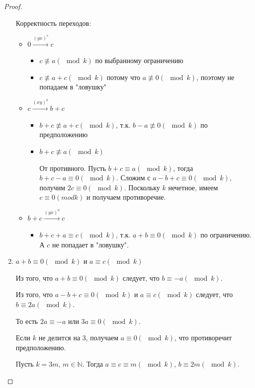 \documentclass{article}
\begin{document}
\begin{proof}
\begin{enumerate}
			Корректность переходов:
			\begin{itemize}
				\item $0 \xrightarrow{(yx)^c} c$
				\begin{itemize}
					\item $c \not \equiv a (\mod k)$ по выбранному ограничению
					\item $c \not \equiv a+c (\mod k)$ потому что $a \not \equiv 0 (\mod k)$, поэтому не попадаем в "ловушку"
				\end{itemize}
			
				\item $c \xrightarrow{(xy)^b} b+c$
				\begin{itemize}
					\item $b+c \not \equiv a+c (\mod k)$, т.к. $b-a \not \equiv 0 (\mod k)$ по предположению
					\item $b+c \not \equiv a (\mod k)$
					
					От противного. Пусть $b+c \equiv a (\mod k)$, тогда $b+c-a \equiv 0 (\mod k)$. Сложим с $a-b+c \equiv 0 (\mod k)$, получим $2c \equiv 0 (\mod k)$. Поскольку $k$ нечетное, имеем $c \equiv 0 (mod k)$ и получаем противоречие.
				\end{itemize}
			
				\item $b+c \xrightarrow{(yx)^a} c$
				\begin{itemize}
					\item $b+c+a \equiv c (\mod k)$, т.к. $a+b \equiv 0 (\mod k)$ по ограничению. А $c$ не попадает в "ловушку".
				\end{itemize}
			\end{itemize}
		
			\item $a+b \equiv 0 (\mod k)$ и $a \equiv c (\mod k)$
			
			Из того, что $a+b \equiv 0 (\mod k)$ следует, что $b \equiv -a (\mod k)$.
			
			Из того, что $a-b+c \equiv 0 (\mod k)$ и $a \equiv c (\mod k)$ следует, что $b \equiv 2a (\mod k)$. 
			
			То есть $2a \equiv -a$ или $3a \equiv 0 (\mod k)$.
			
			Если $k$ не делится на 3, получаем $a \equiv 0 (\mod k)$, что противоречит предположению.
			
			Пусть $k = 3m$, $m \in \mathbb{N}$. Тогда $a \equiv c \equiv m (\mod k)$, $b \equiv 2m (\mod k)$.
			

\end{enumerate}
\end{proof}
\end{document}
